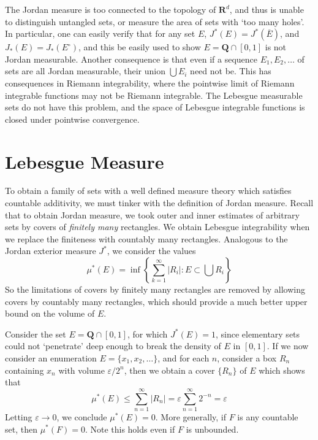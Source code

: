 The Jordan measure is too connected to the topology of $\mathbf{R}^d$, and thus is unable to distinguish untangled sets, or measure the area of sets with `too many holes'. In particular, one can easily verify that for any set $E$, $J^*(E) = J^*(\overline{E})$, and $J_*(E) = J_*(E^\circ)$, and this be easily used to show $E = \mathbf{Q} \cap [0,1]$ is not Jordan measurable. Another consequence is that even if a sequence $E_1, E_2, \dots$ of sets are all Jordan measurable, their union $\bigcup E_i$ need not be. This has consequences in Riemann integrability, where the pointwise limit of Riemann integrable functions may not be Riemann integrable. The Lebesgue measurable sets do not have this problem, and the space of Lebesgue integrable functions is closed under pointwise convergence.

\section{Lebesgue Measure}

To obtain a family of sets with a well defined measure theory which satisfies countable additivity, we must tinker with the definition of Jordan measure. Recall that to obtain Jordan measure, we took outer and inner estimates of arbitrary sets by covers of {\it finitely many} rectangles. We obtain Lebesgue integrability when we replace the finiteness with countably many rectangles. Analogous to the Jordan exterior measure $J^*$, we consider the values
%
\[ \mu^*(E) = \inf \left\{ \sum_{k = 1}^\infty |R_i| : E \subset \bigcup R_i \right\} \]
%
So the limitations of covers by finitely many rectangles are removed by allowing covers by countably many rectangles, which should provide a much better upper bound on the volume of $E$.

\begin{example}
  Consider the set $E = \mathbf{Q} \cap [0,1]$, for which $J^*(E) = 1$, since elementary sets could not `penetrate' deep enough to break the density of $E$ in $[0,1]$. If we now consider an enumeration $E = \{ x_1, x_2, \dots \}$, and for each $n$, consider a box $R_n$ containing $x_n$ with volume $\varepsilon/2^n$, then we obtain a cover $\{ R_n \}$ of $E$ which shows that
  \[ \mu^*(E) \leq \sum_{n = 1}^\infty |R_n| = \varepsilon \sum_{n = 1}^\infty 2^{-n} = \varepsilon \]
  Letting $\varepsilon \to 0$, we conclude $\mu^*(E) = 0$. More generally, if $F$ is any countable set, then $\mu^*(F) = 0$. Note this holds even if $F$ is unbounded.
\end{example}

